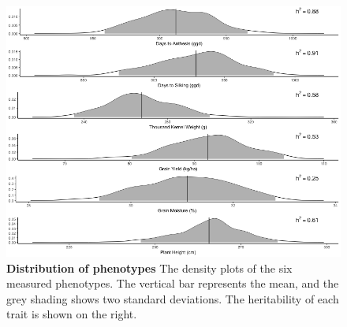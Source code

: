\documentclass[article,9pt,twocolumn,twoside]{rilabRxiv}
\begin{document}
\begin{figure}[ht]
\centering
\includegraphics[width=\linewidth]{figures/Methods_Fig2.png}
\caption{\textbf{Distribution of phenotypes} The density plots of the six measured phenotypes. The vertical bar represents the mean, and the grey shading shows two standard deviations. The heritability of each trait is shown on the right.}
\label{fig:figure2}
\end{figure}
\end{document}
